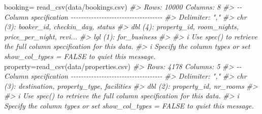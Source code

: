 \documentclass[
]{article}
\newenvironment{Shaded}{\begin{snugshade}}{\end{snugshade}}
\newcommand{\CommentTok}[1]{\textcolor[rgb]{0.56,0.35,0.01}{\textit{#1}}}
\newcommand{\FunctionTok}[1]{\textcolor[rgb]{0.00,0.00,0.00}{#1}}
\newcommand{\NormalTok}[1]{#1}
\newcommand{\OtherTok}[1]{\textcolor[rgb]{0.56,0.35,0.01}{#1}}
\newcommand{\StringTok}[1]{\textcolor[rgb]{0.31,0.60,0.02}{#1}}
\begin{document}
\begin{Shaded}
\begin{Highlighting}[]
\NormalTok{booking}\OtherTok{=} \FunctionTok{read\_csv}\NormalTok{(}\StringTok{\textquotesingle{}data/bookings.csv\textquotesingle{}}\NormalTok{)}
\CommentTok{\#\textgreater{} Rows: 10000 Columns: 8}
\CommentTok{\#\textgreater{} {-}{-} Column specification {-}{-}{-}{-}{-}{-}{-}{-}{-}{-}{-}{-}{-}{-}{-}{-}{-}{-}{-}{-}{-}{-}{-}{-}{-}{-}{-}{-}{-}{-}{-}{-}{-}{-}{-}{-}}
\CommentTok{\#\textgreater{} Delimiter: ","}
\CommentTok{\#\textgreater{} chr (3): booker\_id, checkin\_day, status}
\CommentTok{\#\textgreater{} dbl (4): property\_id, room\_nights, price\_per\_night, revi...}
\CommentTok{\#\textgreater{} lgl (1): for\_business}
\CommentTok{\#\textgreater{} }
\CommentTok{\#\textgreater{} i Use \textasciigrave{}spec()\textasciigrave{} to retrieve the full column specification for this data.}
\CommentTok{\#\textgreater{} i Specify the column types or set \textasciigrave{}show\_col\_types = FALSE\textasciigrave{} to quiet this message.}
\NormalTok{property}\OtherTok{=}\FunctionTok{read\_csv}\NormalTok{(}\StringTok{\textquotesingle{}data/properties.csv\textquotesingle{}}\NormalTok{)}
\CommentTok{\#\textgreater{} Rows: 4178 Columns: 5}
\CommentTok{\#\textgreater{} {-}{-} Column specification {-}{-}{-}{-}{-}{-}{-}{-}{-}{-}{-}{-}{-}{-}{-}{-}{-}{-}{-}{-}{-}{-}{-}{-}{-}{-}{-}{-}{-}{-}{-}{-}{-}{-}{-}{-}}
\CommentTok{\#\textgreater{} Delimiter: ","}
\CommentTok{\#\textgreater{} chr (3): destination, property\_type, facilities}
\CommentTok{\#\textgreater{} dbl (2): property\_id, nr\_rooms}
\CommentTok{\#\textgreater{} }
\CommentTok{\#\textgreater{} i Use \textasciigrave{}spec()\textasciigrave{} to retrieve the full column specification for this data.}
\CommentTok{\#\textgreater{} i Specify the column types or set \textasciigrave{}show\_col\_types = FALSE\textasciigrave{} to quiet this message.}


\end{Highlighting}
\end{Shaded}
\end{document}
